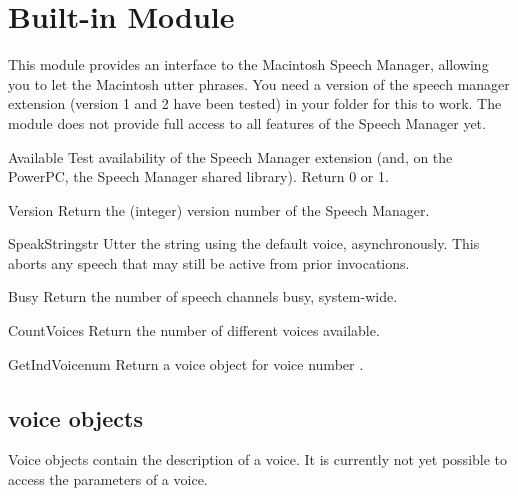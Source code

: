 \section{Built-in Module }

\renewcommand{\indexsubitem}{(in module macspeech)}

This module provides an interface to the Macintosh Speech Manager,
allowing you to let the Macintosh utter phrases. You need a version of
the speech manager extension (version 1 and 2 have been tested) in
your  folder for this to work. The module does not
provide full access to all features of the Speech Manager yet.

\begin{funcdesc}{Available}{}
Test availability of the Speech Manager extension (and, on the
PowerPC, the Speech Manager shared library). Return 0 or 1. 
\end{funcdesc}

\begin{funcdesc}{Version}{}
Return the (integer) version number of the Speech Manager.
\end{funcdesc}

\begin{funcdesc}{SpeakString}{str}
Utter the string  using the default voice,
asynchronously. This aborts any speech that may still be active from
prior  invocations.
\end{funcdesc}

\begin{funcdesc}{Busy}{}
Return the number of speech channels busy, system-wide.
\end{funcdesc}

\begin{funcdesc}{CountVoices}{}
Return the number of different voices available.
\end{funcdesc}

\begin{funcdesc}{GetIndVoice}{num}
Return a voice object for voice number .
\end{funcdesc}

\subsection{voice objects}
Voice objects contain the description of a voice. It is currently not
yet possible to access the parameters of a voice.

\renewcommand{\indexsubitem}{(voice object method)}

